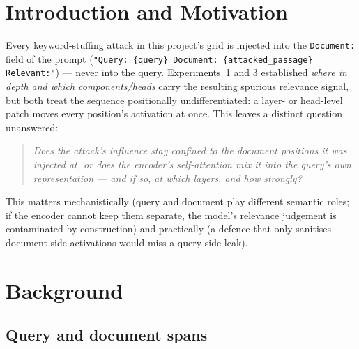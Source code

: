 \documentclass[11pt]{article}
\begin{document}
\tableofcontents
\newpage

\section{Introduction and Motivation}

Every keyword-stuffing attack in this project's grid is injected into the
\texttt{Document:} field of the prompt
(\texttt{"Query: \{query\} Document: \{attacked\_passage\} Relevant:"}) —
never into the query. Experiments~1 and 3 established \emph{where in depth
and which components/heads} carry the resulting spurious relevance signal,
but both treat the sequence positionally undifferentiated: a layer- or
head-level patch moves every position's activation at once. This leaves a
distinct question unanswered:

\begin{quote}
\itshape Does the attack's influence stay confined to the document
positions it was injected at, or does the encoder's self-attention mix it
into the query's own representation — and if so, at which layers, and how
strongly?
\end{quote}

This matters mechanistically (query and document play different semantic
roles; if the encoder cannot keep them separate, the model's relevance
judgement is contaminated by construction) and practically (a defence that
only sanitises document-side activations would miss a query-side leak).

\section{Background}

\subsection{Query and document spans}
\end{document}
